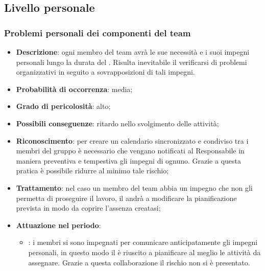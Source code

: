 \documentclass[PianoDiProgetto.tex]{subfiles}
\begin{document}
	\subsection{Livello personale}
		\subsubsection{Problemi personali dei componenti del team}
			\label{sec:ppdct}
\begin{itemize}
		\item \textbf{Descrizione}: ogni membro del team avrà le sue necessità e i suoi impegni personali lungo la durata del . Risulta inevitabile il verificarsi di problemi organizzativi in seguito a sovrapposizioni di tali impegni.
		\item \textbf{Probabilità di occorrenza}: media;
		\item \textbf{Grado di pericolosità}: alto;
		\item \textbf{Possibili conseguenze}: ritardo nello svolgimento delle attività;
		\item \textbf{Riconoscimento}: per creare un calendario sincronizzato e condiviso tra i membri del gruppo è necessario che vengano notificati al Responsabile in maniera preventiva e tempestiva gli impegni di ognuno. Grazie a questa pratica è possibile ridurre al minimo tale rischio;
		\item \textbf{Trattamento}: nel caso un membro del team abbia un impegno che non gli permetta di proseguire il lavoro, il \RESP{} andrà a modificare la pianificazione prevista in modo da coprire l'assenza creatasi;
		\item \textbf{Attuazione nel periodo}: 
			\begin{itemize}
				\item \ARdoc : i membri si sono impegnati per comunicare anticipatamente gli impegni personali, in questo modo il \RESP{} è riuscito a pianificare al meglio le attività da assegnare. Grazie a questa collaborazione il rischio non si è presentato.
			\end{itemize}
	\end{itemize}
\end{document}
